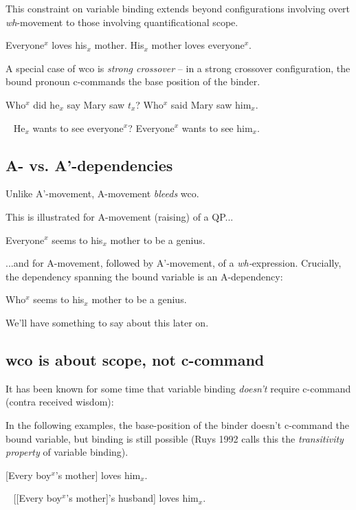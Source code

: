 \documentclass[nols,twoside,nofonts,nobib,nohyper]{tufte-handout}
\begin{document}
This constraint on variable binding
extends beyond configurations involving overt \textit{wh}-movement to those
involving quantificational scope.

\pex
\a Everyone$^{x}$ loves his$_{x}$ mother.
\a\ljudge{*}His$_{x}$ mother loves everyone$^{x}$.
\xe


A special case of \ac{wco} is \textit{strong crossover} -- in a strong crossover
configuration, the bound pronoun c-commands the base position of the binder.

\pex
\a\ljudge{*}Who$^{x}$ did he$_{x}$ say Mary saw $t_{x}$?
\a Who$^{x}$ said Mary saw him$_{x}$.
\xe

\pex~
\a\ljudge{*}He$_{x}$ wants to see everyone$^{x}$?
\a Everyone$^{x}$ wants to see him$_{x}$.
\xe

\subsection{A- vs. A'-dependencies}

Unlike A'-movement, A-movement \textit{bleeds} \ac{wco}.

This is illustrated for A-movement (raising) of a QP...

\ex
Everyone$^{x}$ seems to his$_{x}$ mother to be a genius.
\xe

...and for A-movement, followed by A'-movement, of a \textit{wh-}expression. Crucially,
the dependency spanning the bound variable is an A-dependency:

\ex
Who$^{x}$ seems to his$_{x}$ mother to be a genius.
\xe

We'll have something to say about this later on.

\subsection{\ac{wco} is about scope, not c-command}

It has been known for some time that variable binding \textit{doesn't} require
c-command (contra received wisdom):

In the following examples, the base-position of the binder doesn't c-command the
bound variable, but binding is still possible (Ruys 1992 calls this the
\textit{transitivity property} of variable binding).

\ex
{}[Every boy$^{x}$'s mother] loves him$_{x}$.
\xe

\ex~
{}[[Every boy$^{x}$'s mother]'s husband] loves him$_{x}$.
\xe
\end{document}
